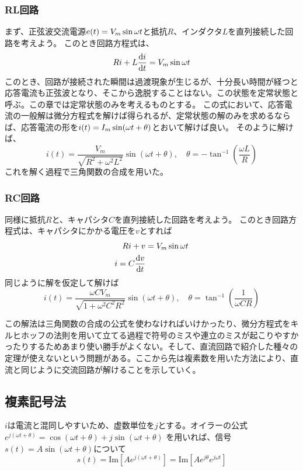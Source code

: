 \documentclass{ltjsreport}
\newcommand{\dft}[1]{\frac{\mathrm{d}#1}{\mathrm{d}t}}
\begin{document}
\subsubsection{RL回路}
まず、正弦波交流電源$e(t) = V_m \sin\omega t$と抵抗$R$、インダクタ$L$を直列接続した回路を考えよう。
このとき回路方程式は、
\[
  Ri +L \dft{i} = \vsin
\]
このとき、回路が接続された瞬間は過渡現象が生じるが、十分長い時間が経つと応答電流も正弦波となり、そこから逸脱することはない。この状態を定常状態と呼ぶ。この章では定常状態のみを考えるものとする。
この式において、応答電流の一般解は微分方程式を解けば得られるが、定常状態の解のみを求めるならば、応答電流の形を$i(t) = I_m \sin(\omega t + \theta)$とおいて解けば良い。
そのように解けば、
\[
  i(t) = \frac{V_m}{\sqrt{R^2 + \omega^2 L^2}} \sin (\omega t + \theta), \quad \theta = -\tan^{-1}(\frac{\omega L}{R})
\]
これを解く過程で三角関数の合成を用いた。

\subsubsection{RC回路}
同様に抵抗$R$と、キャパシタ$C$を直列接続した回路を考えよう。
このとき回路方程式は、キャパシタにかかる電圧を$v$とすれば
\begin{align}
  Ri + v &= \vsin \\
  i = C\dft{v}
\end{align}
同じように解を仮定して解けば
\[
  i(t) = \frac{\omega CV_m}{\sqrt{1+\omega^2 C^2 R^2}} \sin(\omega t +\theta), \quad \theta = \tan^{-1}(\frac{1}{\omega C R})
\]

この解法は三角関数の合成の公式を使わなければいけかったり、微分方程式をキルヒホッフの法則を用いて立てる過程で符号のミスや連立のミスが起こりやすかったりするためあまり使い勝手がよくない。そして、直流回路で紹介した種々の定理が使えないという問題がある。ここから先は複素数を用いた方法により、直流と同じように交流回路が解けることを示していく。

\newcommand{\dist}[2]{\sqrt{#1^2+#2^2}}
\subsection{複素記号法}
\newcommand{\e}[1]{e^{j #1}}
\newcommand{\ejwtth}{\e{(\omega t + \theta)}}
$i$は電流と混同しやすいため、虚数単位を$j$とする。オイラーの公式$e^{j(\omega t+\theta)} = \cos(\omega t + \theta) + j\sin(\omega t + \theta)$
を用いれば、信号$s(t) = A\sin(\omega t + \theta)$について
\begin{equation}\label{eq:def_phasor}
  s(t) = \mathrm{Im}[A e^{j(\omega t + \theta)}] =\mathrm{Im}[ A e^{j\theta}e^{j\omega t}]
\end{equation}
\end{document}
